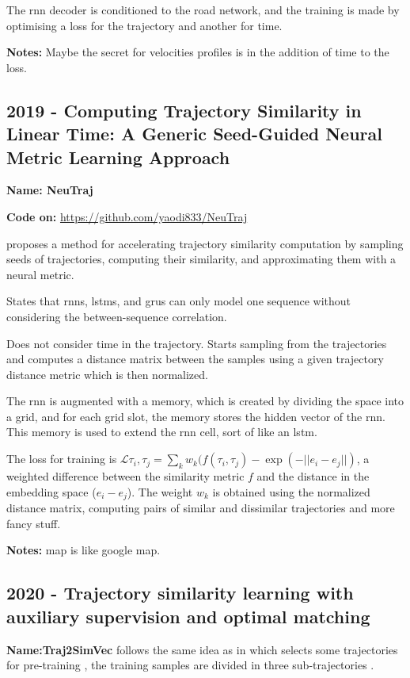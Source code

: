 The \gls{rnn} decoder is conditioned to the road network, and the training is made by optimising a loss for the trajectory and another for time.

\textbf{Notes:} Maybe the secret for velocities profiles is in the addition of time to the loss.

\subsection*{2019 - Computing Trajectory Similarity in Linear Time: A Generic Seed-Guided Neural Metric Learning Approach}

\textbf{Name: NeuTraj}

\textbf{Code on:} \url{https://github.com/yaodi833/NeuTraj}

\cite{yao2019computing} proposes a method for accelerating trajectory similarity computation by sampling seeds of trajectories, computing their similarity, and approximating them with a neural metric.

States that \glspl{rnn}, \glspl{lstm}, and \glspl{gru} can only  model one sequence without considering the between-sequence correlation.

Does not consider time in the trajectory. Starts sampling from the trajectories and computes a distance matrix between the samples using a given trajectory distance metric which is then normalized.

The \gls{rnn} is augmented with a memory, which is created by dividing the space into a grid, and for each grid slot, the memory stores the hidden vector of the \gls{rnn}. This memory is used to extend the \gls{rnn} cell, sort of like an \gls{lstm}.

The loss for training is $\mathcal{L}{\tau_i, \tau_j}=\sum_k w_k(f(\tau_i, \tau_j)-\exp(-||e_i-e_j||)$, a weighted difference between the similarity metric $f$ and the distance in the embedding space ($e_i-e_j$). The weight $w_k$ is obtained using the normalized distance matrix, computing pairs of similar and dissimilar trajectories and more fancy stuff.

\textbf{Notes:} map is like google map.

\subsection*{2020 - Trajectory similarity learning with auxiliary supervision and optimal matching}

\textbf{Name:Traj2SimVec}
\cite{zhang2020trajectory} follows the same idea as in \cite{yao2019computing} which selects some trajectories for pre-training , the training samples are divided in three sub-trajectories .

